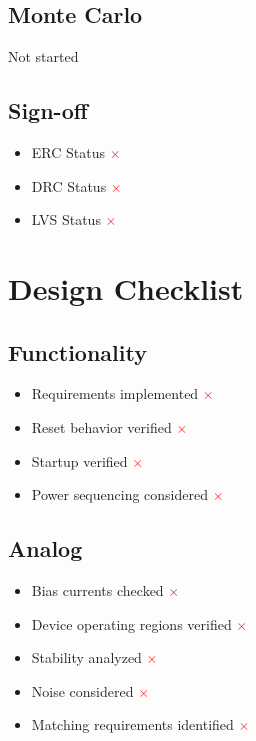 \documentclass{article}
\begin{document}
\subsection{Monte Carlo}

Not started


\subsection{Sign-off}

\begin{itemize}
    \item{ERC Status \textcolor{red}{$\times$}}
    \item{DRC Status \textcolor{red}{$\times$}}
    \item{LVS Status \textcolor{red}{$\times$}}
\end{itemize}

\newpage

\section{Design Checklist}

\subsection{Functionality}

\begin{itemize}
    \item{Requirements implemented \textcolor{red}{$\times$}}
    \item{Reset behavior verified \textcolor{red}{$\times$}}
    \item{Startup verified \textcolor{red}{$\times$}}
    \item{Power sequencing considered \textcolor{red}{$\times$}}
\end{itemize}

\subsection{Analog}

\begin{itemize}
    \item{Bias currents checked \textcolor{red}{$\times$}}
    \item{Device operating regions verified \textcolor{red}{$\times$}}
    \item{Stability analyzed \textcolor{red}{$\times$}}
    \item{Noise considered \textcolor{red}{$\times$}}
    \item{Matching requirements identified \textcolor{red}{$\times$}}
\end{itemize}
\end{document}

